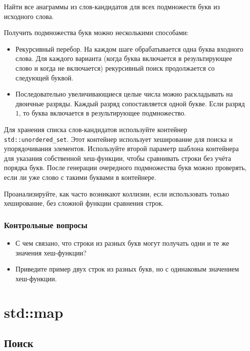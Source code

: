 \documentclass[10pt,twoside,openany]{book}
\begin{document}
Найти все анаграммы из слов-кандидатов для всех подмножеств букв из исходного слова.

Получить подмножества букв можно несколькими способами:
\begin{itemize}
    \item Рекурсивный перебор. На каждом шаге обрабатывается одна буква входного слова.
          Для каждого варианта (когда буква включается в результирующее слово и когда не включается)
          рекурсивный поиск продолжается со следующей буквой.
    \item Последовательно увеличивающиеся целые числа можно раскладывать на двоичные разряды.
          Каждый разряд сопоставляется одной букве. Если разряд $1$, то буква включается
          в результирующее подмножество.
\end{itemize}

Для хранения списка слов-кандидатов используйте контейнер {\tt std::unordered\_set}.
Этот контейнер использует хеширование для поиска и упорядочивания элементов.
Используйте второй параметр шаблона контейнера для указания собственной хеш-функции,
чтобы сравнивать строки без учёта порядка букв.
После генерации очередного подмножества букв можно проверять, если ли уже слово с такими
буквами в контейнере.

Проанализируйте, как часто возникают коллизии, если использовать только хеширование,
без сложной функции сравнения строк.

\subsection*{Контрольные вопросы}

\begin{itemize}
    \item С чем связано, что строки из разных букв могут получать одни и те же значения
          хеш-функции?
    \item Приведите пример двух строк из разных букв, но с одинаковым значением хеш-функции.
\end{itemize}

\chapter{std::map}

\section{Поиск}
\end{document}
